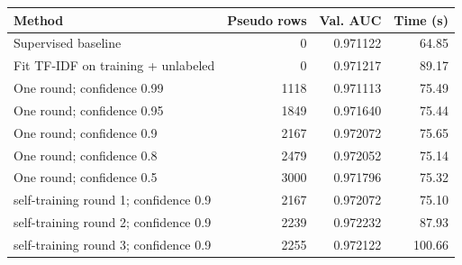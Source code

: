 \par\noindent
\begin{tabularx}{\linewidth}{@{}Yrrr@{}}
\toprule
Method & Pseudo rows & Val. AUC & Time (s) \\
\midrule
Supervised baseline & 0 & 0.971122 & 64.85 \\
Fit TF-IDF on training + unlabeled & 0 & 0.971217 & 89.17 \\
One round; confidence 0.99 & 1118 & 0.971113 & 75.49 \\
One round; confidence 0.95 & 1849 & 0.971640 & 75.44 \\
One round; confidence 0.9 & 2167 & 0.972072 & 75.65 \\
One round; confidence 0.8 & 2479 & 0.972052 & 75.14 \\
One round; confidence 0.5 & 3000 & 0.971796 & 75.32 \\
self-training round 1; confidence 0.9 & 2167 & 0.972072 & 75.10 \\
self-training round 2; confidence 0.9 & 2239 & 0.972232 & 87.93 \\
self-training round 3; confidence 0.9 & 2255 & 0.972122 & 100.66 \\
\bottomrule
\end{tabularx}
\par
